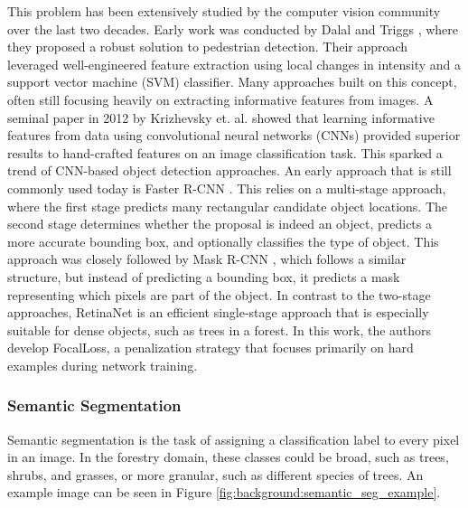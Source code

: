 This problem has been extensively studied by the computer vision community over the last two decades. Early work was conducted by Dalal and Triggs \cite{Dalal2005humanDetection}, where they proposed a robust solution to pedestrian detection. Their approach leveraged well-engineered feature extraction using local changes in intensity and a support vector machine (SVM) classifier. Many approaches built on this concept, often still focusing heavily on extracting informative features from images. A seminal paper in 2012 by Krizhevsky et. al. \cite{NIPS2012_c399862d} showed that learning informative features from data using convolutional neural networks (CNNs) provided superior results to hand-crafted features on an image classification task. This sparked a trend of CNN-based object detection approaches. An early approach that is still commonly used today is Faster R-CNN \cite{Ren2017FasterNetworks}. This relies on a multi-stage approach, where the first stage predicts many rectangular candidate object locations. The second stage determines whether the proposal is indeed an object, predicts a more accurate bounding box, and optionally classifies the type of object. This approach was closely followed by Mask R-CNN \cite{He2017MaskR-CNN}, which follows a similar structure, but instead of predicting a bounding box, it predicts a mask representing which pixels are part of the object. In contrast to the two-stage approaches, RetinaNet \cite{Lin2020FocalDetection} is an efficient single-stage approach that is especially suitable for dense objects, such as trees in a forest. In this work, the authors develop FocalLoss, a penalization strategy that focuses primarily on hard examples during network training.


\subsubsection{Semantic Segmentation}
Semantic segmentation is the task of assigning a classification label to every pixel in an image. In the forestry domain, these classes could be broad, such as trees, shrubs, and grasses, or more granular, such as different species of trees. An example image can be seen in Figure \ref{fig:background:semantic_seg_example}.


